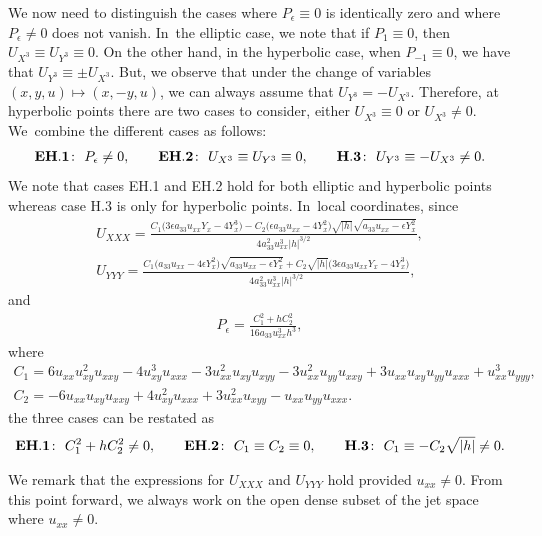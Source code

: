 \documentclass[pdftex]{sigma}%
\numberwithin{equation}{section}
\begin{document}
We now need to distinguish the cases where $P_{\epsilon}\equiv 0$ is identically zero and where $P_{\epsilon}\neq 0$ does not vanish. In~the elliptic case, we note that if $P_1 \equiv 0$, then $U_{X^3}\equiv U_{Y^3}\equiv 0$. On the other hand, in the hyperbolic case, when $P_{-1} \equiv 0$, we have that $U_{Y^3} \equiv \pm U_{X^3}$. But, we observe that under the change of variables $(x,y,u)\mapsto (x,-y,u)$, we can always assume that $U_{Y^3}=-U_{X^3}$. Therefore, at hyperbolic points there are two cases to consider, either $U_{X^3} \equiv 0$ or $U_{X^3} \neq 0$. We~combine the different cases as follows:
\begin{gather*}
{\bf EH.1}\colon\ P_\epsilon \neq 0,\qquad
{\bf EH.2}\colon\ U_{X^3}\equiv U_{Y^3} \equiv 0,\qquad
{\bf H.3}\colon\ U_{Y^3} \equiv - U_{X^3}\neq 0.
\end{gather*}
We note that cases EH.1 and EH.2 hold for both elliptic and hyperbolic points whereas case H.3 is only for hyperbolic points. In~local coordinates, since
%
\begin{gather*}
U_{XXX} = \frac{C_1\big(3\epsilon a_{33} u_{xx}Y_x - 4Y_x^3\big)-C_2\big(\epsilon a_{33}u_{xx}-4 Y_x^2\big)\sqrt{|h|}\sqrt{a_{33}u_{xx} - \epsilon Y_x^2}}{4a_{33}^2u_{xx}^3 |h|^{3/2}},
\\[1ex]
U_{YYY} = \frac{C_1 \big(a_{33}u_{xx}-4\epsilon Y_x^2\big)\sqrt{a_{33}u_{xx}-\epsilon Y_x^2}+C_2\sqrt{|h|}\big(3\epsilon a_{33}u_{xx}Y_x - 4 Y_x^3\big)}{4a_{33}^2u_{xx}^3|h|^{3/2}},
\end{gather*}
%
and
\begin{gather*}
P_\epsilon = \frac{C_1^2 + hC_2^2}{16 a_{33}u_{xx}^3h^3},
\end{gather*}
where
%
\begin{gather*}%
C_1 = 6u_{xx}u_{xy}^2u_{xxy} - 4u_{xy}^3 u_{xxx} - 3u_{xx}^2u_{xy}u_{xyy}-3u_{xx}^2u_{yy}u_{xxy}+3u_{xx}u_{xy}u_{yy}u_{xxx}+u_{xx}^3u_{yyy},
\\
C_2 = -6u_{xx}u_{xy}u_{xxy}+4u_{xy}^2u_{xxx}+3u_{xx}^2u_{xyy}-u_{xx}u_{yy}u_{xxx}.
\end{gather*}
%
the three cases can be restated as
\begin{gather*}
{\bf EH.1}\colon\ C_1^2 + hC_2^2\neq 0,\qquad
{\bf EH.2}\colon\ C_1 \equiv C_2 \equiv 0,\qquad
{\bf H.3}\colon\ C_1 \equiv - C_2 \sqrt{|h|}\neq 0.
\end{gather*}

\begin{Remark}%
We remark that the expressions for $U_{XXX}$ and $U_{YYY}$ hold provided $u_{xx}\neq 0$. From this point forward, we always work on the open dense subset of the jet space where $u_{xx}\neq 0$.
\end{Remark}
\end{document}
